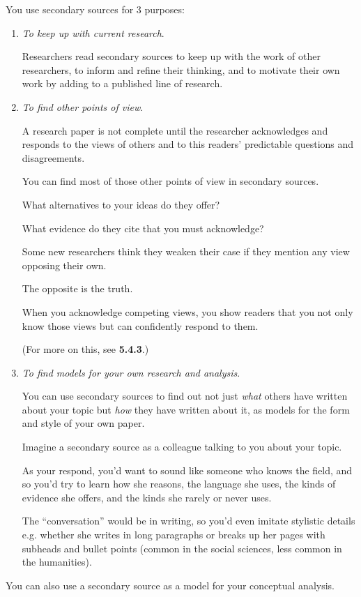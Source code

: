 \documentclass[oneside]{book}
\numberwithin{equation}{section}
\begin{document}
%
You use secondary sources for 3 purposes:
\begin{enumerate}
    \item \textit{To keep up with current research}.
    
    Researchers read secondary sources to keep up with the work of other researchers, to inform and refine their thinking, and to motivate their own work by adding to a published line of research.
    \item \textit{To find other points of view}.
    
    A research paper is not complete until the researcher acknowledges and responds to the views of others and to this readers' predictable questions and disagreements.
    
    You can find most of those other points of view in secondary sources.
    
    What alternatives to your ideas do they offer?
    
    What evidence do they cite that you must acknowledge?
    
    Some new researchers think they weaken their case if they mention any view opposing their own.
    
    The opposite is the truth.
    
    When you acknowledge competing views, you show readers that you not only know those views but can confidently respond to them.
    
    (For more on this, see \textbf{5.4.3}.)
    \item \textit{To find models for your own research and analysis}.
    
    You can use secondary sources to find out not just \textit{what} others have written about your topic but \textit{how} they have written about it, as models for the form and style of your own paper.
    
    Imagine a secondary source as a colleague talking to you about your topic.
    
    As your respond, you'd want to sound like someone who knows the field, and so you'd try to learn how she reasons, the language she uses, the kinds of evidence she offers, and the kinds she rarely or never uses.
    
    The ``conversation'' would be in writing, so you'd even imitate stylistic details e.g. whether she writes in long paragraphs or breaks up her pages with subheads and bullet points (common in the social sciences, less common in the humanities).
\end{enumerate}
You can also use a secondary source as a model for your conceptual analysis.
\end{document}
